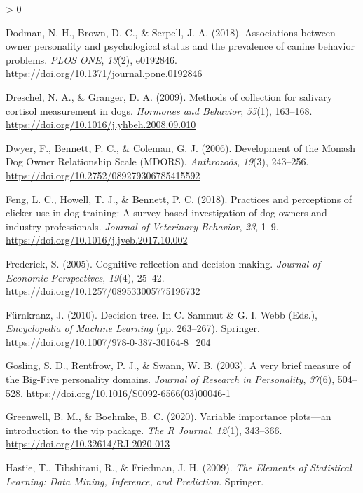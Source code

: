 \documentclass[
  english,
  ,pub,floatsintext]{apa6}
\newlength{\cslhangindent}
\newenvironment{CSLReferences}[2] %
 {%
  \setlength{\parindent}{0pt}
  \ifodd #1 \everypar{\setlength{\hangindent}{\cslhangindent}}\ignorespaces\fi
  \ifnum #2 > 0
  \setlength{\parskip}{#2\baselineskip}
  \fi
 }%
 {}
\begin{document}
\begin{CSLReferences}{1}{0}
\leavevmode\hypertarget{ref-Dodman.etal.2018}{}%
Dodman, N. H., Brown, D. C., \& Serpell, J. A. (2018). Associations between owner personality and psychological status and the prevalence of canine behavior problems. \emph{PLOS ONE}, \emph{13}(2), e0192846. \url{https://doi.org/10.1371/journal.pone.0192846}

\leavevmode\hypertarget{ref-Dreschel.Granger.2009}{}%
Dreschel, N. A., \& Granger, D. A. (2009). Methods of collection for salivary cortisol measurement in dogs. \emph{Hormones and Behavior}, \emph{55}(1), 163--168. \url{https://doi.org/10.1016/j.yhbeh.2008.09.010}

\leavevmode\hypertarget{ref-Dwyer.etal.2006}{}%
Dwyer, F., Bennett, P. C., \& Coleman, G. J. (2006). Development of the {Monash Dog Owner Relationship Scale} ({MDORS}). \emph{Anthrozoös}, \emph{19}(3), 243--256. \url{https://doi.org/10.2752/089279306785415592}

\leavevmode\hypertarget{ref-Feng.etal.2018}{}%
Feng, L. C., Howell, T. J., \& Bennett, P. C. (2018). Practices and perceptions of clicker use in dog training: {A} survey-based investigation of dog owners and industry professionals. \emph{Journal of Veterinary Behavior}, \emph{23}, 1--9. \url{https://doi.org/10.1016/j.jveb.2017.10.002}

\leavevmode\hypertarget{ref-Frederick.2005}{}%
Frederick, S. (2005). Cognitive reflection and decision making. \emph{Journal of Economic Perspectives}, \emph{19}(4), 25--42. \url{https://doi.org/10.1257/089533005775196732}

\leavevmode\hypertarget{ref-Furnkranz.2010}{}%
Fürnkranz, J. (2010). Decision tree. In C. Sammut \& G. I. Webb (Eds.), \emph{Encyclopedia of {Machine Learning}} (pp. 263--267). {Springer}. \url{https://doi.org/10.1007/978-0-387-30164-8_204}

\leavevmode\hypertarget{ref-Gosling.etal.2003}{}%
Gosling, S. D., Rentfrow, P. J., \& Swann, W. B. (2003). A very brief measure of the {Big}-{Five} personality domains. \emph{Journal of Research in Personality}, \emph{37}(6), 504--528. \url{https://doi.org/10.1016/S0092-6566(03)00046-1}

\leavevmode\hypertarget{ref-R-vip}{}%
Greenwell, B. M., \& Boehmke, B. C. (2020). Variable importance plots---an introduction to the vip package. \emph{The R Journal}, \emph{12}(1), 343--366. \url{https://doi.org/10.32614/RJ-2020-013}

\leavevmode\hypertarget{ref-Hastie.etal.2009}{}%
Hastie, T., Tibshirani, R., \& Friedman, J. H. (2009). \emph{The {Elements} of {Statistical Learning}: {Data Mining}, {Inference}, and {Prediction}}. {Springer}.


\end{CSLReferences}
\end{document}

